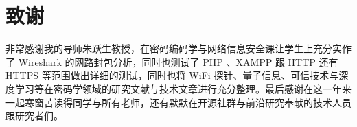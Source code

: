 \chapter{致谢}

非常感谢我的导师朱跃生教授，在密码编码学与网络信息安全课让学生上充分实作了  Wireshark 的网路封包分析，同时也测试了 PHP 、XAMPP 跟 HTTP 还有 HTTPS 等范围做出详细的测试，同时也将 WiFi 探针、量子信息、可信技术与深度学习等在密码学领域的研究文献与技术文章进行充分整理。最后感谢在这一年来一起寒窗苦读得同学与所有老师，还有默默在开源社群与前沿研究奉献的技术人员跟研究者们。